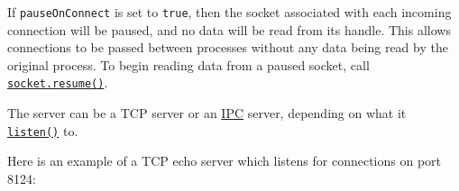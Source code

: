 If \texttt{pauseOnConnect} is set to \texttt{true}, then the socket
associated with each incoming connection will be paused, and no data
will be read from its handle. This allows connections to be passed
between processes without any data being read by the original process.
To begin reading data from a paused socket, call
\hyperref[socketresume]{\texttt{socket.resume()}}.

The server can be a TCP server or an \hyperref[ipc-support]{IPC} server,
depending on what it \hyperref[serverlisten]{\texttt{listen()}} to.

Here is an example of a TCP echo server which listens for connections on
port 8124:

\begin{Shaded}
\begin{Highlighting}[]
\OperatorTok{=} \NormalTok{(}\NormalTok{)}\OperatorTok{;}
\OperatorTok{=}\KeywordTok{=\textgreater{}}\NormalTok{ \{}
  \NormalTok{(}\NormalTok{)}\OperatorTok{;}
\NormalTok{(}\OperatorTok{,}\NormalTok{ () }\KeywordTok{=\textgreater{}}\NormalTok{ \{}
    \NormalTok{(}\NormalTok{)}\OperatorTok{;}
\NormalTok{  \})}\OperatorTok{;}
\NormalTok{(}\StringTok{\textquotesingle{}}\NormalTok{)}\OperatorTok{;}
\OperatorTok{;}
\NormalTok{\})}\OperatorTok{;}
\NormalTok{(}\OperatorTok{,}\KeywordTok{=\textgreater{}}\NormalTok{ \{}
  \OperatorTok{;}
\NormalTok{\})}\OperatorTok{;}
\NormalTok{(}\OperatorTok{,}\NormalTok{ () }\KeywordTok{=\textgreater{}}\NormalTok{ \{}
  \NormalTok{(}\NormalTok{)}\OperatorTok{;}
\NormalTok{\})}\OperatorTok{;}
\end{Highlighting}
\end{Shaded}

